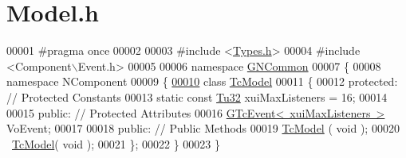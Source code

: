 \hypertarget{_model_8h_source}{}\section{Model.\+h}
\label{_model_8h_source}

\begin{DoxyCode}
00001 \textcolor{preprocessor}{#pragma once}
00002 
00003 \textcolor{preprocessor}{#include <\mbox{\hyperlink{_types_8h}{Types.h}}>}
00004 \textcolor{preprocessor}{#include <Component\(\backslash\)Event.h>}
00005 
00006 \textcolor{keyword}{namespace }\mbox{\hyperlink{namespace_g_n_common}{GNCommon}}
00007 \{
00008    \textcolor{keyword}{namespace }NComponent
00009    \{
\mbox{\hyperlink{class_g_n_common_1_1_n_component_1_1_tc_model}{00010}}       \textcolor{keyword}{class }\mbox{\hyperlink{class_g_n_common_1_1_n_component_1_1_tc_model}{TcModel}}
00011       \{
00012       \textcolor{keyword}{protected}:     \textcolor{comment}{// Protected Constants}
00013          \textcolor{keyword}{static} \textcolor{keyword}{const} \mbox{\hyperlink{namespace_g_n_common_a941b527ef318f318aed7903dc832b7e4}{Tu32}} xuiMaxListeners = 16;
00014 
00015       \textcolor{keyword}{public}:     \textcolor{comment}{// Protected Attributes}
00016          \mbox{\hyperlink{class_g_n_common_1_1_n_component_1_1_g_tc_event}{GTcEvent< xuiMaxListeners >}} VoEvent;
00017 
00018       \textcolor{keyword}{public}:        \textcolor{comment}{// Public Methods}
00019          \mbox{\hyperlink{class_g_n_common_1_1_n_component_1_1_tc_model}{TcModel}} ( \textcolor{keywordtype}{void} );
00020          ~\mbox{\hyperlink{class_g_n_common_1_1_n_component_1_1_tc_model}{TcModel}}( \textcolor{keywordtype}{void} );
00021       \};
00022    \}
00023 \}
\end{DoxyCode}
